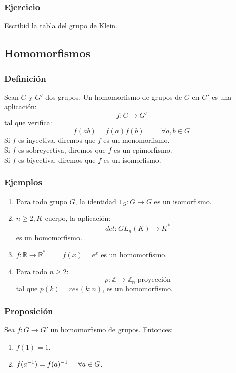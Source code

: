 \documentclass[11pt,a4paper]{article}
\begin{document}
\subsubsection*{Ejercicio}

Escribid la tabla del grupo de Klein.

\subsection{Homomorfismos}

\subsubsection*{Definición}

Sean $G$ y $G'$ dos grupos. Un homomorfismo de grupos de $G$ en $G'$ es una aplicación:
$$f: G \to G'$$
tal que verifica:
$$f(ab) = f(a)f(b) \hspace{1cm} \forall a,b \in G$$
Si $f$ es inyectiva, diremos que $f$ es un monomorfismo. \\
Si $f$ es sobreyectiva, diremos que $f$ es un epimorfismo. \\
Si $f$ es biyectiva, diremos que $f$ es un isomorfismo.

\subsubsection*{Ejemplos}

\begin{enumerate}
\item Para todo grupo $G$, la identidad $1_{G}: G \to G$ es un isomorfismo.
\item $n \geq 2, K$ cuerpo, la aplicación:
$$det: GL_{n}(K) \to K^{*}$$
es un homomorfismo.
\item $f: \mathbb{R} \to \mathbb{R}^{*} \hspace{1cm} f(x) = e^{x}$ es un homomorfismo.
\item Para todo $n \geq 2$:
$$p: \mathbb{Z} \to \mathbb{Z_{n}} \text{ proyección}$$
tal que $p(k) = res(k; n)$, es un homomorfismo.
\end{enumerate}

\subsubsection*{Proposición}

Sea $f: G \to G'$ un homomorfismo de grupos. Entonces:
\begin{enumerate}
\item $f(1) = 1$.
\item $f(a^{-1}) = f(a)^{-1} \hspace{0.5cm} \forall a \in G$.
\end{enumerate}
\end{document}
